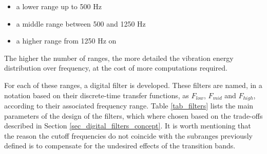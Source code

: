 \documentclass[conference]{IEEEtran}
\begin{document}
\begin{itemize}
	\item a lower range up to 500 Hz
	\item a middle range between 500 and 1250 Hz
	\item a higher range from 1250 Hz on
\end{itemize}

The higher the number of ranges, the more detailed the vibration energy distribution over frequency, at the cost of more computations required.

For each of these ranges, a digital filter is developed. These filters are named, in a notation based on their discrete-time transfer functions, as $F_{low}$, $F_{mid}$ and $F_{high}$, according to their associated frequency range. Table \ref{tab_filters} lists the main parameters of the design of the filters, which where chosen based on the trade-offs described in Section \ref{sec_digital_filters_concept}. It is worth mentioning that the reason the cutoff frequencies do not coincide with the subranges previously defined is to compensate for the undesired effects of the transition bands.


\end{document}
